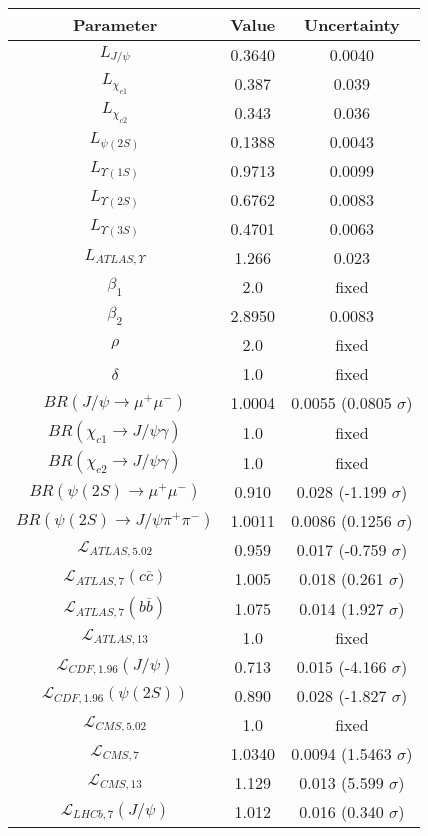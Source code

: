 \begin{table}[h!]
\centering
\begin{tabular}{c|c|c}
Parameter & Value & Uncertainty \\
\hline
$L_{J/\psi}$ & 0.3640 & 0.0040 \\
$L_{\chi_{c1}}$ & 0.387 & 0.039 \\
$L_{\chi_{c2}}$ & 0.343 & 0.036 \\
$L_{\psi(2S)}$ & 0.1388 & 0.0043 \\
$L_{\Upsilon(1S)}$ & 0.9713 & 0.0099 \\
$L_{\Upsilon(2S)}$ & 0.6762 & 0.0083 \\
$L_{\Upsilon(3S)}$ & 0.4701 & 0.0063 \\
$L_{ATLAS,\Upsilon}$ & 1.266 & 0.023 \\
$\beta_1$ & 2.0 & fixed \\
$\beta_2$ & 2.8950 & 0.0083 \\
$\rho$ & 2.0 & fixed \\
$\delta$ & 1.0 & fixed \\
$BR(J/\psi\rightarrow\mu^+\mu^-)$ & 1.0004 & 0.0055 (0.0805 $\sigma$) \\
$BR(\chi_{c1}\rightarrow J/\psi\gamma)$ & 1.0 & fixed \\
$BR(\chi_{c2}\rightarrow J/\psi\gamma)$ & 1.0 & fixed \\
$BR(\psi(2S)\rightarrow\mu^+\mu^-)$ & 0.910 & 0.028 (-1.199 $\sigma$) \\
$BR(\psi(2S)\rightarrow J/\psi\pi^+\pi^-)$ & 1.0011 & 0.0086 (0.1256 $\sigma$) \\
$\mathcal L_{ATLAS,5.02}$ & 0.959 & 0.017 (-0.759 $\sigma$) \\
$\mathcal L_{ATLAS,7}(c\overline c)$ & 1.005 & 0.018 (0.261 $\sigma$) \\
$\mathcal L_{ATLAS,7}(b\overline b)$ & 1.075 & 0.014 (1.927 $\sigma$) \\
$\mathcal L_{ATLAS,13}$ & 1.0 & fixed \\
$\mathcal L_{CDF,1.96}(J/\psi)$ & 0.713 & 0.015 (-4.166 $\sigma$) \\
$\mathcal L_{CDF,1.96}(\psi(2S))$ & 0.890 & 0.028 (-1.827 $\sigma$) \\
$\mathcal L_{CMS,5.02}$ & 1.0 & fixed \\
$\mathcal L_{CMS,7}$ & 1.0340 & 0.0094 (1.5463 $\sigma$) \\
$\mathcal L_{CMS,13}$ & 1.129 & 0.013 (5.599 $\sigma$) \\
$\mathcal L_{LHCb,7}(J/\psi)$ & 1.012 & 0.016 (0.340 $\sigma$) \\

\end{tabular}
\end{table}
